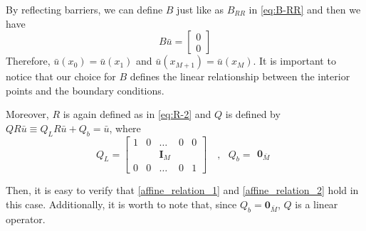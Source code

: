 \documentclass[11pt]{article}
\begin{document}
By reflecting barriers, we can define $B$ just like as $B_{RR}$ in \cref{eq:B-RR} and then we have
\begin{equation}
B\bar{u} = \begin{bmatrix}
0\\
0
\end{bmatrix} \label{B_reflecting}
\end{equation}
Therefore, $\bar{u}(x_0) = \bar{u}(x_1)$ and $\bar{u}(x_{M+1}) = \bar{u}(x_M)$. It is important to notice that our choice for $B$ defines the linear relationship between the interior points and the boundary conditions.

Moreover, $R$ is again defined as in \cref{eq:R-2} and $Q$ is defined by $Q R\bar{u}\equiv Q_L R\bar{u}+Q_b = \bar{u}$, where
\begin{equation}
Q_L = \begin{bmatrix}
1& 0&\dots&0&0\\
 & & \mathbf{I}_M & & \\
0&0&\dots&0&1
\end{bmatrix}%
\quad , \text{ } Q_b = \begin{matrix}
\mathbf{0}_{\bar{M}}
\end{matrix}\label{Q_reflecting}
\end{equation}

Then, it is easy to verify that \cref{affine_relation_1} and \cref{affine_relation_2} hold in this case. Additionally, it is worth to note that, since $Q_b = \mathbf{0}_{\bar{M}}$, $Q$ is a linear operator.
\end{document}
